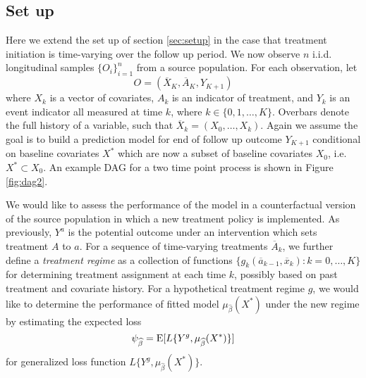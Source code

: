 \subsection{Set up}
Here we extend the set up of section \ref{sec:setup} in the case that treatment initiation is time-varying over the follow up period. We now observe $n$ i.i.d. longitudinal samples $\{O_i\}_{i=1}^n$ from a source population. For each observation, let 
\[O =(\overline{X}_K, \overline{A}_K, Y_{K+1})\]
where $X_k$ is a vector of covariates, $A_k$ is an indicator of treatment, and $Y_k$ is an event indicator all measured at time $k$, where $k \in \{0,1,\ldots, K\}$. Overbars denote the full history of a variable, such that $\overline{X}_k = (X_0,\dots, X_k)$. Again we assume the goal is to build a prediction model for end of follow up outcome $Y_{K+1}$ conditional on baseline covariates $X^*$ which are now a subset of baseline covariates $X_0$, i.e. $X^* \subset X_0$. An example DAG for a two time point process is shown in Figure \ref{fig:dag2}.

We would like to assess the performance of the model in a counterfactual version of the source population in which a new treatment policy is implemented. As previously, $Y^a$ is the potential outcome under an intervention which sets treatment $A$ to $a$. For a sequence of time-varying treatments $\overline{A}_k$, we further define a \textit{treatment regime} as a collection of functions $\{g_k(\overline{a}_{k-1}, \overline{x}_k): k=0,\ldots, K\}$ for determining treatment assignment at each time $k$, possibly based on past treatment and covariate history. For a hypothetical treatment regime $g$, we would like to determine the performance of fitted model $\mu_{\widehat{\beta}}(X^*)$ under the new regime by estimating the expected loss 
$$\psi_{\widehat{\beta}} = \operatorname{E}[L\{Y^g, \mu_{\widehat{\beta}}(X^*)\}]$$
for generalized loss function $L\{Y^g, \mu_{\widehat{\beta}}(X^*)\}$.

